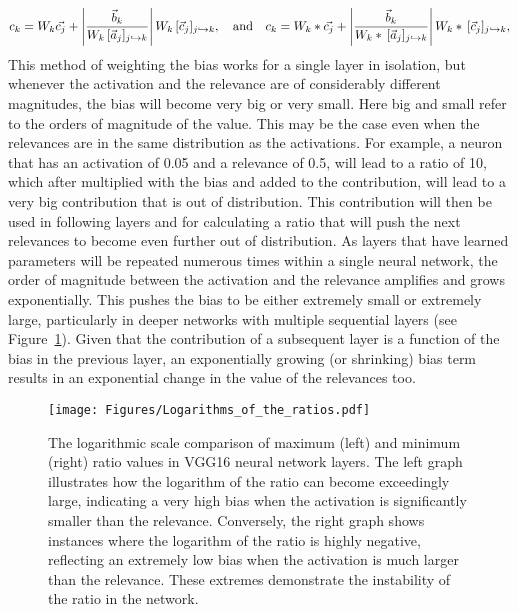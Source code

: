 \begin{equation*}
   c_k = W_k \vec{c_j} + \left| \dfrac{\vec{b}_k}{W_k\,[\vec{a}_j]_{j\hookrightarrow k}}\right| W_k\,[\vec{c}_j]_{j\hookrightarrow k}, \quad \mbox{and}\quad c_k = W_k \ast \vec{c_j} + \left| \dfrac{\vec{b}_k}{W_k \ast \,[\vec{a}_j]_{j\hookrightarrow k}}\right| W_k\ast \,[\vec{c}_j]_{j\hookrightarrow k},
\end{equation*}
\newline
\newline
This method of weighting the bias works for a single layer in isolation, but whenever the activation and the relevance are of considerably different magnitudes, the bias will become very big or very small. Here big and small refer to the orders of magnitude of the value. This may be the case even when the relevances are in the same distribution as the activations. For example, a neuron that has an activation of 0.05 and a relevance of 0.5, will lead to a ratio of 10, which after multiplied with the bias and added to the contribution, will lead to a very big contribution that is out of distribution. This contribution will then be used in following layers and for calculating a ratio that will push the next relevances to become even further out of distribution. As layers that have learned parameters will be repeated numerous times within a single neural network, the order of magnitude between the activation and the relevance amplifies and grows exponentially. This pushes the bias to be either extremely small or extremely large, particularly in deeper networks with multiple sequential layers (see Figure~\ref{fig:exponential}). Given that the contribution of a subsequent layer is a function of the bias in the previous layer, an exponentially growing (or shrinking) bias term results in an exponential change in the value of the relevances too. 

\begin{figure}[ht!]
	\begin{center}
		\texttt{[image: Figures/Logarithms\_of\_the\_ratios.pdf]}
	\end{center}
	\caption{The logarithmic scale comparison of maximum (left) and minimum (right) ratio values in VGG16 neural network layers. The left graph illustrates how the logarithm of the ratio can become exceedingly large, indicating a very high bias when the activation is significantly smaller than the relevance. Conversely, the right graph shows instances where the logarithm of the ratio is highly negative, reflecting an extremely low bias when the activation is much larger than the relevance. These extremes demonstrate the instability of the ratio in the network.}
	\label{fig:exponential}
\end{figure} 

